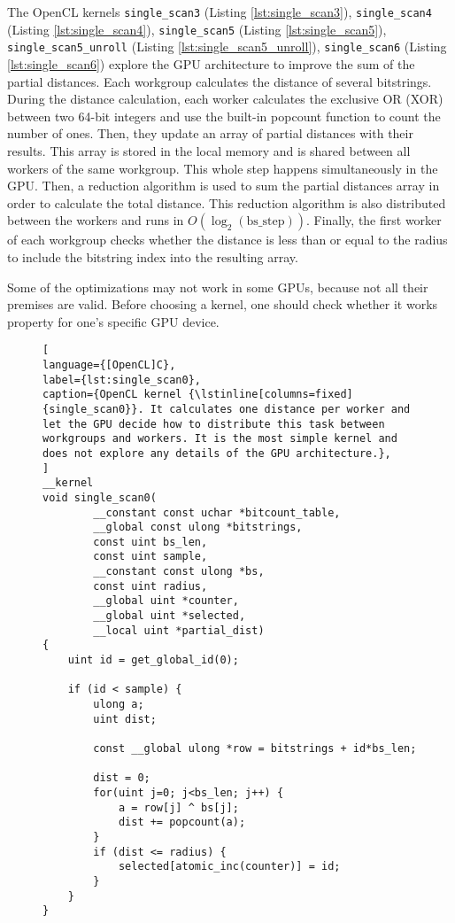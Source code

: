 The OpenCL kernels \lstinline{single_scan3} (Listing \ref{lst:single_scan3}), \lstinline{single_scan4} (Listing \ref{lst:single_scan4}), \lstinline{single_scan5} (Listing \ref{lst:single_scan5}), \lstinline{single_scan5_unroll} (Listing \ref{lst:single_scan5_unroll}), \lstinline{single_scan6} (Listing \ref{lst:single_scan6}) explore the GPU architecture to improve the sum of the partial distances. Each workgroup calculates the distance of several bitstrings. During the distance calculation, each worker calculates the exclusive OR (XOR) between two 64-bit integers and use the built-in popcount function to count the number of ones. Then, they update an array of partial distances with their results. This array is stored in the local memory and is shared between all workers of the same workgroup. This whole step happens simultaneously in the GPU. Then, a reduction algorithm is used to sum the partial distances array in order to calculate the total distance. This reduction algorithm is also distributed between the workers and runs in $O(\log_2(\text{bs\_step}))$. Finally, the first worker of each workgroup checks whether the distance is less than or equal to the radius to include the bitstring index into the resulting array.

Some of the optimizations may not work in some GPUs, because not all their premises are valid. Before choosing a kernel, one should check whether it works property for one's specific GPU device.


\begin{figure}[!p]
\begin{lstlisting}[
language={[OpenCL]C},
label={lst:single_scan0},
caption={OpenCL kernel {\lstinline[columns=fixed]{single_scan0}}. It calculates one distance per worker and let the GPU decide how to distribute this task between workgroups and workers. It is the most simple kernel and does not explore any details of the GPU architecture.},
]
__kernel
void single_scan0(
		__constant const uchar *bitcount_table,
		__global const ulong *bitstrings,
		const uint bs_len,
		const uint sample,
		__constant const ulong *bs,
		const uint radius,
		__global uint *counter,
		__global uint *selected,
		__local uint *partial_dist)
{
	uint id = get_global_id(0);

	if (id < sample) {
		ulong a;
		uint dist;

		const __global ulong *row = bitstrings + id*bs_len;

		dist = 0;
		for(uint j=0; j<bs_len; j++) {
			a = row[j] ^ bs[j];
			dist += popcount(a);
		}
		if (dist <= radius) {
			selected[atomic_inc(counter)] = id;
		}
	}
}
\end{lstlisting}
\end{figure}


